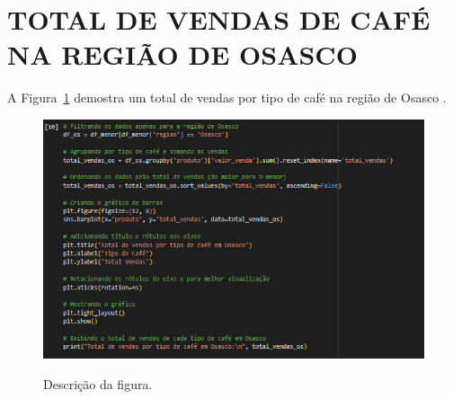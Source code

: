 \section{TOTAL DE VENDAS DE CAFÉ NA REGIÃO DE OSASCO}
	\label{sec:identificao}
\label{sec:figura}
A Figura~\ref{figuras/configuraçao-mais-vendido-Osasco.png} demostra um total de vendas por tipo de café na região de Osasco .
\begin{figure}[!ht]
	{\centering
		\caption{Descrição da figura.}
		\includegraphics[width=1.0\textwidth]{figuras/configuraçao-mais-vendido-Osasco.png}
		\label{figuras/configuraçao-mais-vendido-Osasco.png}
	}
\end{figure} \\ \\ \\ \\ \\ \\ \\  \\ \\ \\ \\ \\ 

